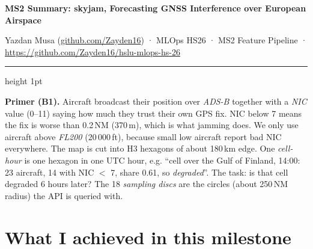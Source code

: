 \documentclass[10pt,a4paper]{article}
\newcommand{\repo}{https://github.com/Zayden16/hslu-mlops-hs-26}
\begin{document}
{\color{hslu}\Large\bfseries MS2 Summary: skyjam, Forecasting GNSS Interference over European Airspace\par}
\vspace{0.35ex}
{\small Yazdan Musa (\href{https://github.com/Zayden16}{github.com/Zayden16}) · MLOps HS26 · MS2 Feature Pipeline · \url{\repo}\par}
\vspace{0.4ex}
{\color{hslu}\hrule height 1pt}
\vspace{0.3ex}

\textbf{Primer (B1).} Aircraft broadcast their position over \emph{ADS-B} together with a
\emph{NIC} value (0--11) saying how much they trust their own GPS fix. NIC below 7 means
the fix is worse than 0.2\,NM (370\,m), which is what jamming does. We only use aircraft
above \emph{FL200} (20\,000\,ft), because small low aircraft report bad NIC everywhere. The
map is cut into H3 hexagons of about 180\,km edge. One \emph{cell-hour} is one hexagon in
one UTC hour, e.g. ``cell over the Gulf of Finland, 14:00: 23 aircraft, 14 with NIC $<$ 7,
share 0.61, so \emph{degraded}''. The task: is that cell degraded 6 hours later?
The 18 \emph{sampling discs} are the circles (about 250\,NM radius) the API is queried with.

\section{What I achieved in this milestone}
\end{document}
